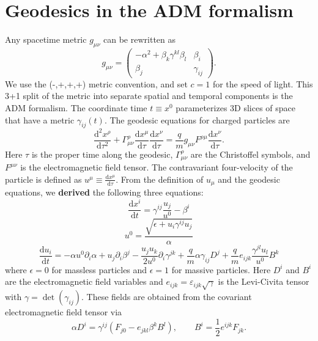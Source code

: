 \documentclass{article}
\begin{document}
\section{Geodesics in the ADM formalism}

Any spacetime metric $g_{\mu\nu}$ can be rewritten as \cite{rezzolla2013}
\begin{equation}
    g_{\mu\nu} = 
    \begin{pmatrix}
    -\alpha^2+\beta_k\gamma^{kl}\beta_l & \beta_i\\
    \beta_j & \gamma_{ij}
    \end{pmatrix}.
\end{equation}
We use the (-,+,+,+) metric convention, and set $c=1$ for the speed of light. This 3+1 split of the metric into separate spatial and temporal components is the ADM formalism. The coordinate time $t \equiv x^0$ parameterizes 3D slices of space that have a metric $\gamma_{ij}(t)$. The geodesic equations for charged particles are
\begin{equation}
\label{eq:geodesic}
    \frac{\text{d}^2x^\rho}{\text{d}\tau^2} + \Gamma^\rho_{\mu\nu} \frac{\text{d}x^\mu}{\text{d}\tau} \frac{\text{d}x^\nu}{\text{d}\tau} = \frac{q}{m}g_{\mu\nu}F^{\rho\mu}\frac{\text{d}x^\nu}{\text{d}\tau}.
\end{equation}
Here $\tau$ is the proper time along the geodesic, $\Gamma^\rho_{\mu\nu}$ are the Christoffel symbols, and $F^{\mu\nu}$ is the electromagnetic field tensor. The contravariant four-velocity of the particle is defined as $u^\mu \equiv \frac{\text{d}x^\mu}{\text{d}\tau}$. From the definition of $u_\mu$ and the geodesic equations, we \textbf{derived} the following three equations:
\begin{equation}
\label{eq:geodesic_adm1}
    \frac{\text{d}x^i}{\text{d}t} = \gamma^{ij}\frac{u_j}{u^0} - \beta^i
\end{equation}
\begin{equation}
\label{eq:geodesic_adm2}
    u^0 = \frac{\sqrt{\epsilon + u_i\gamma^{ij}u_j}}{\alpha}
\end{equation}
\begin{equation}
\label{eq:geodesic_adm3}
    \frac{\text{d}u_i}{\text{d}t} = -\alpha u^0\partial_i\alpha + u_j\partial_i\beta^j - \frac{u_ju_k}{2u^0}\partial_i\gamma^{jk} + \frac{q}{m}\alpha\gamma_{ij}D^j + \frac{q}{m}e_{ijk}\frac{\gamma^{jl}u_l}{u^0}B^k
\end{equation}
where $\epsilon = 0$ for massless particles and $\epsilon = 1$ for massive particles. Here $D^i$ and $B^i$ are the electromagnetic field variables and $e_{ijk} = \varepsilon_{ijk}\sqrt{\gamma}$ is the Levi-Civita tensor with $\gamma = \det(\gamma_{ij})$. These fields are obtained from the covariant electromagnetic field tensor via
\begin{equation}
    \alpha D^i = \gamma^{ij}\left(F_{j0} - e_{jkl}\beta^k B^l\right), \qquad B^i = \frac{1}{2}e^{ijk}F_{jk}.
\end{equation}
\end{document}
